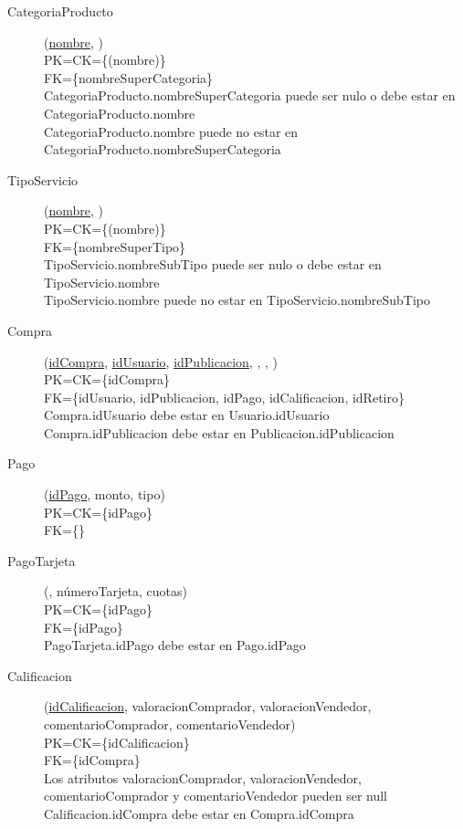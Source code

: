 \begin{description}
 \item[CategoriaProducto](\underline{nombre}, )\\
PK=CK=\{(nombre)\}\\
FK=\{nombreSuperCategoria\}\\
CategoriaProducto.nombreSuperCategoria puede ser nulo o debe estar en CategoriaProducto.nombre\\
CategoriaProducto.nombre puede no estar en CategoriaProducto.nombreSuperCategoria

 \item[TipoServicio](\underline{nombre}, )\\
PK=CK=\{(nombre)\}\\
FK=\{nombreSuperTipo\}\\
TipoServicio.nombreSubTipo puede ser nulo o debe estar en TipoServicio.nombre\\
TipoServicio.nombre puede no estar en TipoServicio.nombreSubTipo


 \item[Compra](\underline{idCompra}, \underline{idUsuario}, \underline{idPublicacion}, , , )\\
PK=CK=\{idCompra\}\\
FK=\{idUsuario, idPublicacion, idPago, idCalificacion, idRetiro\}\\
Compra.idUsuario debe estar en Usuario.idUsuario \\
Compra.idPublicacion debe estar en Publicacion.idPublicacion

 \item[Pago](\underline{idPago}, monto, tipo)\\
PK=CK=\{idPago\}\\
FK=\{\}\\

 \item[PagoTarjeta](\underline{}, númeroTarjeta, cuotas)\\
PK=CK=\{idPago\}\\
FK=\{idPago\}\\
PagoTarjeta.idPago debe estar en Pago.idPago

 \item[Calificacion](\underline{idCalificacion}, valoracionComprador, valoracionVendedor, comentarioComprador, comentarioVendedor)\\
PK=CK=\{idCalificacion\}\\
FK=\{idCompra\}\\
Los atributos valoracionComprador, valoracionVendedor, comentarioComprador y comentarioVendedor pueden ser null\\
Calificacion.idCompra debe estar en Compra.idCompra


\end{description}
